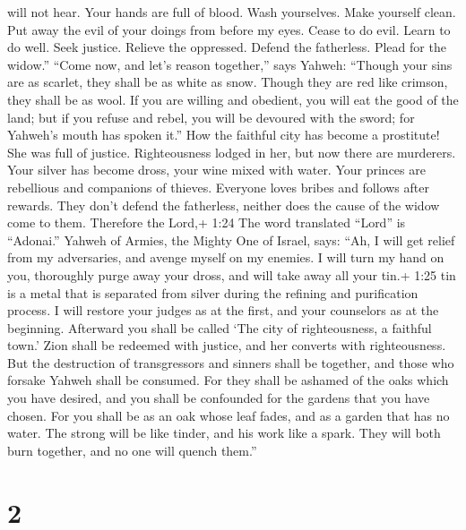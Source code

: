 will not hear. Your hands are full of blood.  Wash
yourselves. Make yourself clean. Put away the evil of your doings from
before my eyes. Cease to do evil.  Learn to do well. Seek
justice. Relieve the oppressed. Defend the fatherless. Plead for the
widow.''  ``Come now, and let's reason together,'' says
Yahweh: ``Though your sins are as scarlet, they shall be as white as
snow. Though they are red like crimson, they shall be as wool.
 If you are willing and obedient, you will eat the good of
the land;  but if you refuse and rebel, you will be
devoured with the sword; for Yahweh's mouth has spoken it.''
 How the faithful city has become a prostitute! She was
full of justice. Righteousness lodged in her, but now there are
murderers.  Your silver has become dross, your wine mixed
with water.  Your princes are rebellious and companions of
thieves. Everyone loves bribes and follows after rewards. They don't
defend the fatherless, neither does the cause of the widow come to them.
 Therefore the Lord,+ 1:24 The word translated ``Lord'' is
``Adonai.'' Yahweh of Armies, the Mighty One of Israel, says: ``Ah, I
will get relief from my adversaries, and avenge myself on my enemies.
 I will turn my hand on you, thoroughly purge away your
dross, and will take away all your tin.+ 1:25 tin is a metal that is
separated from silver during the refining and purification process.
 I will restore your judges as at the first, and your
counselors as at the beginning. Afterward you shall be called `The city
of righteousness, a faithful town.'  Zion shall be redeemed
with justice, and her converts with righteousness.  But the
destruction of transgressors and sinners shall be together, and those
who forsake Yahweh shall be consumed.  For they shall be
ashamed of the oaks which you have desired, and you shall be confounded
for the gardens that you have chosen.  For you shall be as
an oak whose leaf fades, and as a garden that has no water.
 The strong will be like tinder, and his work like a spark.
They will both burn together, and no one will quench them.''

\hypertarget{section-1}{%
\section{2}\label{section-1}}

